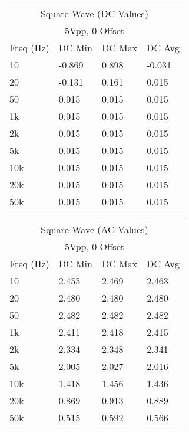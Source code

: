 \documentclass[%
 aip,
 jmp,
 amsmath,
 amssymb,
 reprint,%
 numerical,
 longbibliography,
]{revtex4-1}
\begin{document}
		\begin{tabularx}{0.45\textwidth}[t]{| X | X | X | X |}
		\hline
		\multicolumn{4}{|c|}{Square Wave (DC Values)}\\
		\multicolumn{4}{|c|}{5Vpp, 0 Offset}\\		
		\hline
			\multicolumn{1}{|c|}{Freq (Hz)} & 
			\multicolumn{1}{c|}{DC Min} & 
			\multicolumn{1}{c|}{DC Max} &
			\multicolumn{1}{c|}{DC Avg} \\ 
		\hline
		10 & -0.869 & 0.898 & -0.031\\ \hline
		20 & -0.131 & 0.161 & 0.015 \\ \hline
		50 & 0.015 & 0.015 & 0.015 \\ \hline
		1k & 0.015 & 0.015 & 0.015 \\ \hline
		2k & 0.015 & 0.015 & 0.015 \\ \hline
		5k & 0.015 & 0.015 & 0.015 \\ \hline
		10k & 0.015 & 0.015 & 0.015 \\ \hline
		20k & 0.015 & 0.015 & 0.015 \\ \hline
		50k & 0.015 & 0.015 & 0.015 \\ \hline
		\end{tabularx}
	
		\begin{tabularx}{0.45\textwidth}[t]{| X | X | X | X |}
		\hline
		\multicolumn{4}{|c|}{Square Wave (AC Values)}\\
		\multicolumn{4}{|c|}{5Vpp, 0 Offset}\\
		\hline
			\multicolumn{1}{|c|}{Freq (Hz)} & 
			\multicolumn{1}{c|}{DC Min} & 
			\multicolumn{1}{c|}{DC Max} &
			\multicolumn{1}{c|}{DC Avg} \\ 
		\hline
		10  & 2.455 & 2.469 & 2.463\\ \hline
		20  & 2.480 & 2.480 & 2.480\\ \hline
		50  & 2.482 & 2.482 & 2.482\\ \hline
		1k  & 2.411 & 2.418 & 2.415\\ \hline
		2k  & 2.334 & 2.348 & 2.341\\ \hline
		5k  & 2.005 & 2.027 & 2.016\\ \hline
		10k & 1.418 & 1.456 & 1.436\\ \hline
		20k & 0.869 & 0.913 & 0.889\\ \hline
		50k & 0.515 & 0.592 & 0.566\\ \hline
		\end{tabularx}
	
\end{document}
